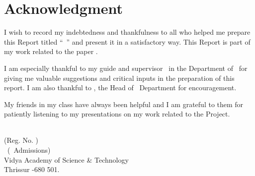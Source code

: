 %
\chapter*{Acknowledgment}
%
I wish to record my indebtedness and thankfulness 
to all who helped me prepare this Report titled 
``\vtitle\ ''  and present it in a satisfactory way. This Report is part of my work related to the paper \vpaper.

I am especially thankful to my
guide and supervisor \vguide\  in the Department of \vdept\  
for giving me valuable suggestions and 
critical inputs in the preparation of this report. 
I am also thankful to \vhod, 
the Head of \vdept\  Department
for encouragement. 

My friends in my class have always been 
helpful and I am grateful to them for 
patiently listening to my presentations on my work related to the Project. 

\begin{flushright}
\vauthora\\ {\footnotesize (Reg. No. \vregisternumbera)}\\
\vclass\  (\vadmissionyear\  Admissions)\\
Vidya Academy of Science \& Technology\\
Thrissur -680 501.
\end{flushright}